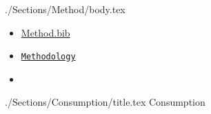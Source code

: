 \documentclass{\econtex}\newcommand{\texname}{Syllabus}
\begin{document}
\begin{verbatimwrite}{./Sections/Method/body.tex}

\begin{itemize}
\item[Bib:] \href{https://ccarrollatjhuecon.github.io/Choice/Syllabus/Method.bib}{Method.bib}
\item[Handouts:]  \texttt{\href{https://www.econ2.jhu.edu/people/ccarroll/Public/Lecturenotes/CourseIntro/Methodology}{Methodology}}
\item[Readings:]
\end{itemize}


\begin{itemize} 
\reqd \cite{summersIllusion}  
\reqd \cite{acemogluCrisis}   
\reqd \cite{krugmanHistory}   
\reqd \cite{caballeroPretense}
\reqd \cite{barberaFight}     
\reqd \cite{romerTrouble}
\end{itemize}

\end{verbatimwrite}



\begin{verbatimwrite}{./Sections/Consumption/title.tex}
Consumption
\end{verbatimwrite}
\end{document}
